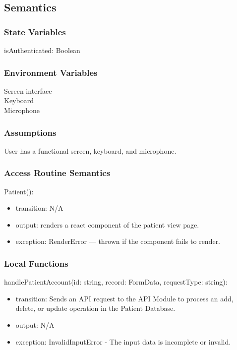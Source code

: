 \documentclass[12pt, titlepage]{article}
\begin{document}
\subsection{Semantics}

\subsubsection{State Variables}
isAuthenticated: Boolean

\subsubsection{Environment Variables}
Screen interface\\
Keyboard\\
Microphone\\

\subsubsection{Assumptions}
User has a functional screen, keyboard, and microphone.

\subsubsection{Access Routine Semantics}

\noindent Patient():
\begin{itemize}
\item transition: N/A
\item output: renders a react component of the patient view page.
\item exception: RenderError — thrown if the component fails to render.
\end{itemize}

\subsubsection{Local Functions}

\noindent handlePatientAccount(id: string, record: FormData, requestType: string):
\begin{itemize}
\item transition: Sends an API request to the API Module to process an add, delete, or update operation in the Patient Database.
\item output: N/A
\item exception: InvalidInputError - The input data is incomplete or invalid.  
\end{itemize}
\end{document}
